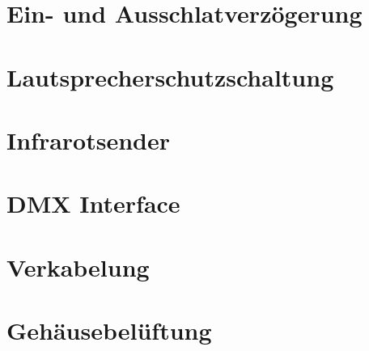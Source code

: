 \documentclass[
    headings=optiontotocandhead,%
    twoside,
    numbers=noenddot,%
    toc=flat, %
    12pt, %
    titlepage, %
    parskip=full, %
    listof=totoc, %
    listof=flat, %
    numbers=noenddot, %
    bibliography=totoc, %
    a4paper,DIV=14,
    BCOR=15mm,
]{scrbook}
\begin{document}
\renewcommand{\kapitelautor}{Autor: Clemens Scharwitzl}

% 

\section{Ein- und Ausschlatverzögerung}\label{Ein-und-Ausschlatversögerung}

\renewcommand{\kapitelautor}{Autor: Clemens Scharwitzl}

% 

\section{Lautsprecherschutzschaltung}\label{Lautsprecherschutzschaltung}

\renewcommand{\kapitelautor}{Autor: Clemens Scharwitzl}

% 

\section{Infrarotsender}\label{Infrarotsender}

\renewcommand{\kapitelautor}{Autor: Clemens Scharwitzl}

% 

\section{DMX Interface}\label{DMX-Interface}

\renewcommand{\kapitelautor}{Autor: Clemens Scharwitzl}

% 

\section{Verkabelung}\label{Verkabelung}

\renewcommand{\kapitelautor}{Autor: Clemens Scharwitzl}

% 

\section{Gehäusebelüftung}\label{Gehäusebelüftung}
\end{document}
